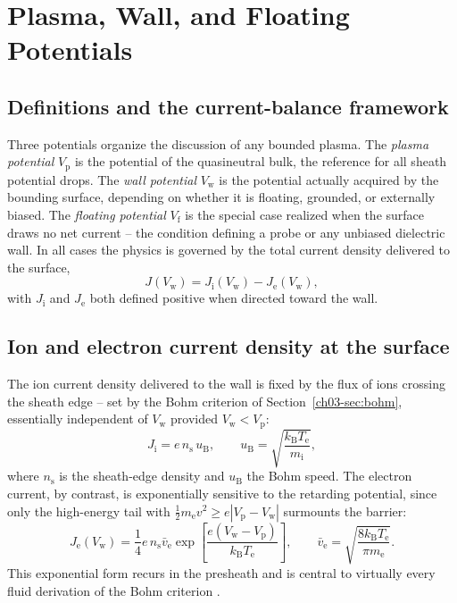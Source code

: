 \section{Plasma, Wall, and Floating Potentials}

\subsection{Definitions and the current-balance framework}

Three potentials organize the discussion of any bounded plasma. The \emph{plasma potential} $V_{\mathrm{p}}$ is the potential of the quasineutral bulk, the reference for all sheath potential drops. The \emph{wall potential} $V_{\mathrm{w}}$ is the potential actually acquired by the bounding surface, depending on whether it is floating, grounded, or externally biased. The \emph{floating potential} $V_{\mathrm{f}}$ is the special case realized when the surface draws no net current -- the condition defining a probe or any unbiased dielectric wall. In all cases the physics is governed by the total current density delivered to the surface,
\begin{equation}
J(V_{\mathrm{w}}) = J_{\mathrm{i}}(V_{\mathrm{w}}) - J_{\mathrm{e}}(V_{\mathrm{w}}),
\end{equation}
with $J_{\mathrm{i}}$ and $J_{\mathrm{e}}$ both defined positive when directed toward the wall.

\subsection{Ion and electron current density at the surface}

The ion current density delivered to the wall is fixed by the flux of ions crossing the sheath edge -- set by the Bohm criterion of Section~\ref{ch03-sec:bohm}, essentially independent of $V_{\mathrm{w}}$ provided $V_{\mathrm{w}} < V_{\mathrm{p}}$:
\begin{equation}
J_{\mathrm{i}} = e\, n_{\mathrm{s}}\, u_{\mathrm{B}}, \qquad u_{\mathrm{B}} = \sqrt{\frac{k_{\mathrm{B}} T_{\mathrm{e}}}{m_{\mathrm{i}}}},
\label{eq:bohm-flux}
\end{equation}
where $n_{\mathrm{s}}$ is the sheath-edge density and $u_{\mathrm{B}}$ the Bohm speed. The electron current, by contrast, is exponentially sensitive to the retarding potential, since only the high-energy tail with $\tfrac12 m_{\mathrm{e}} v^{2} \geq e|V_{\mathrm{p}} - V_{\mathrm{w}}|$ surmounts the barrier:
\begin{equation}
J_{\mathrm{e}}(V_{\mathrm{w}}) = \frac{1}{4} e\, n_{\mathrm{s}} \bar{v}_{\mathrm{e}} \exp\!\left[ \frac{e (V_{\mathrm{w}} - V_{\mathrm{p}})}{k_{\mathrm{B}} T_{\mathrm{e}}} \right], \qquad \bar{v}_{\mathrm{e}} = \sqrt{\frac{8 k_{\mathrm{B}} T_{\mathrm{e}}}{\pi m_{\mathrm{e}}}}.
\label{eq:electron-retarded-flux}
\end{equation}
This exponential form recurs in the presheath and is central to virtually every fluid derivation of the Bohm criterion \cite{ref0013}.


